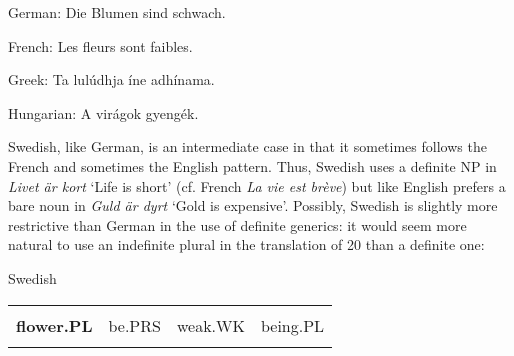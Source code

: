 \begin{styleExLtrTblii}
German: Die Blumen sind schwach.

\end{styleExLtrTblii}

\begin{styleExLtrTblii}
French: Les fleurs sont faibles.

\end{styleExLtrTblii}

\begin{styleExLtrTblii}
Greek: Ta lulúdhja íne adhínama.

\end{styleExLtrTblii}

\begin{styleExLtrTblii}
Hungarian: A virágok gyengék.

\end{styleExLtrTblii}

\begin{styleBodyTextFirst}
Swedish, like German, is an intermediate case in that it sometimes follows the French and sometimes the English pattern. Thus, Swedish uses a definite NP in \textit{Livet är kort} ‘Life is short’ (cf. French \textit{La vie est brève}) but like English prefers a bare noun in \textit{Guld är dyrt} ‘Gold is expensive’. Possibly, Swedish is slightly more restrictive than German in the use of definite generics: it would seem more natural to use an indefinite plural in the translation of 20 than a definite one:

\end{styleBodyTextFirst}


\begin{listWWNumileveli}
\item {}

\begin{styleExample}
Swedish

\end{styleExample}

\end{listWWNumileveli}

\begin{tabular}{llll}
\lsptoprule
\multicolumn{4}{l}{{\bfseries Blommor}

}\\
{\bfseries flower.PL} & be.PRS & weak.WK & being.PL\\
\lspbottomrule
\end{tabular}

